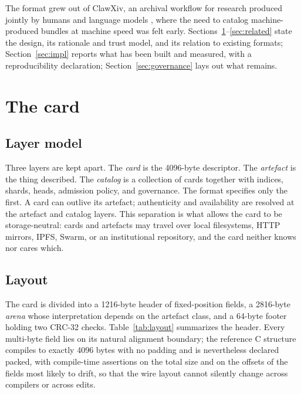 \documentclass[sigconf]{acmart}
\begin{document}
The format grew out of ClawXiv, an archival workflow for research produced
jointly by humans and language models \cite{Kornai:2026a}, where the need to
catalog machine-produced bundles at machine speed was felt early.
Sections~\ref{sec:card}--\ref{sec:related} state the design, its rationale
and trust model, and its relation to existing formats;
Section~\ref{sec:impl} reports what has been built and measured, with a
reproducibility declaration; Section~\ref{sec:governance} lays out what
remains.

\section{The card}
\label{sec:card}

\subsection{Layer model}

Three layers are kept apart. The \emph{card} is the 4096-byte descriptor. The
\emph{artefact} is the thing described. The \emph{catalog} is a collection of
cards together with indices, shards, heads, admission policy, and governance.
The format specifies only the first. A card can outlive its artefact;
authenticity and availability are resolved at the artefact and catalog layers.
This separation is what allows the card to be storage-neutral: cards and
artefacts may travel over local filesystems, HTTP mirrors, IPFS, Swarm, or an
institutional repository, and the card neither knows nor cares which.

\subsection{Layout}

The card is divided into a 1216-byte header of fixed-position fields, a
2816-byte \emph{arena} whose interpretation depends on the artefact class, and a
64-byte footer holding two CRC-32 checks. Table~\ref{tab:layout} summarizes the
header. Every multi-byte field lies on its natural alignment boundary; the
reference C structure compiles to exactly 4096 bytes with no padding and is
nevertheless declared packed, with compile-time assertions on the total size
and on the offsets of the fields most likely to drift, so that the wire layout
cannot silently change across compilers or across edits.
\end{document}
